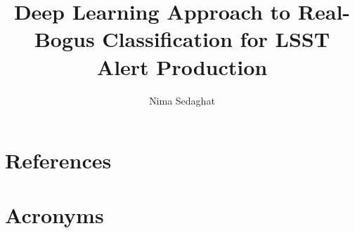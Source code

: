 \documentclass[DM,authoryear,toc]{lsstdoc}
\title{Deep Learning Approach to Real-Bogus Classification for LSST Alert Production}
\author{%
Nima Sedaghat
}
\date{\vcsDate}
\begin{document}
\maketitle



\appendix
\section{References} \label{sec:bib}
\renewcommand{\refname}{} %


\section{Acronyms} \label{sec:acronyms}

\end{document}
